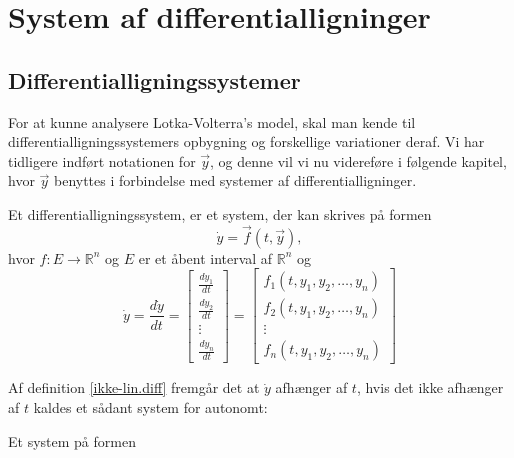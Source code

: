 \chapter{System af differentialligninger}

\section{Differentialligningssystemer}
For at kunne analysere Lotka-Volterra's model, skal man kende til differentialligningssystemers opbygning og forskellige variationer deraf. Vi har tidligere indført notationen for $\vec y$, og denne vil vi nu videreføre i følgende kapitel, hvor $\vec y$ benyttes i forbindelse med systemer af differentialligninger. 

\begin{definition}[Et differentialligningssystem] \label{ikke-lin.diff}
Et differentialligningssystem, er et system, der kan skrives på formen
$$\dot{y}=\vec{f}(t, \vec{y}),$$
hvor $f: E \to \mathbb{R}^n$ og $E$ er et åbent interval af $\mathbb{R}^n$ og
$$\dot{y} = \frac{d\dot{y}}{dt} = 
\begin{bmatrix}
\frac{dy_1}{dt} \\
\frac{dy_2}{dt}\\
\vdots \\
\frac{dy_n}{dt}
\end{bmatrix}
=
\begin{bmatrix}
f_1(t, y_1, y_2, \hdots, y_n)\\
f_2(t, y_1, y_2, \hdots, y_n)\\
\vdots \\
f_n(t, y_1, y_2, \hdots, y_n)
\end{bmatrix}$$
\end{definition}

Af definition \ref{ikke-lin.diff} fremgår det at $\dot{y}$ afhænger af $t$, hvis det ikke afhænger af $t$ kaldes et sådant system for autonomt:
\begin{definition}
Et system på formen
$$$$
\end{definition}

